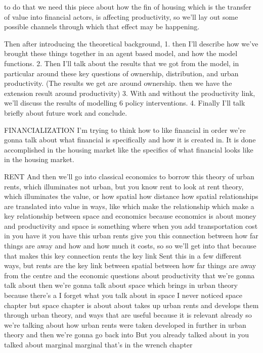 \documentclass[]{article}
\begin{document}
to do that we need this piece about how the fin of housing which is the transfer of value into financial actors, is affecting productivity, so we'll lay out some possible channels through which that effect may be happening.

Then  after introducing the theoretical background, 
1. then I'll describe how we've brought these things together in an agent based model, and how the model functions. 
2. Then I'll talk about the results that we got from the model, in particular around these key questions of ownership, distribution, and urban productivity.  (The results we get  are around ownership. then we have the extension result around productivity) 
3. With and without the productivity link, we'll discuss the results of modelling 6 policy interventions. 
4. Finally I'll talk briefly about future work and conclude. 

FINANCIALIZATION
I’m trying to think how to like financial in order we’re gonna talk about what financial is specifically and how it is created in. It is done accomplished in the housing market like the specifics of what financial looks like in the housing market.

RENT
And then we’ll go into classical economics to borrow this theory of urban rents, which illuminates not urban, but you know rent to look at rent theory, which illuminates the value, or how spatial how distance how spatial relationships are translated into value in ways, like which make the relationship which make a key relationship between space and economics because economics is about money and productivity and space is something where when you add transportation cost in you have it you have this urban rents give you this connection between how far things are away and how and how much it costs, so so we’ll get into that because that makes this key connection rents the key link Sent this in a few different ways, but rents are the key link between spatial between how far things are away from the centre and the economic questions about productivity that we’re gonna talk about then we’re gonna talk about space which brings in urban theory because there’s a I forget what you talk about in space I never noticed space chapter but space chapter is about about takes up urban rents and develops them through urban theory, and ways that are useful because it is relevant already so we’re talking about how urban rents were taken developed in further in urban theory and then we’re gonna go back into But you already talked about in you talked about marginal marginal that’s in the wrench chapter
\end{document}
